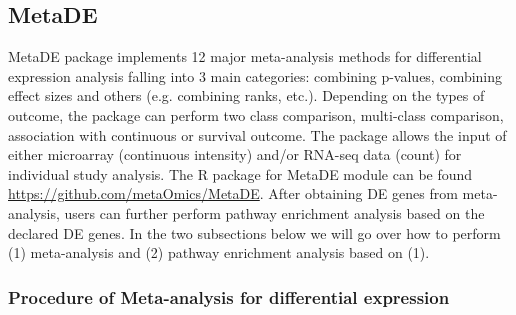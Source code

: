 \subsection{MetaDE}

MetaDE package implements 12 major meta-analysis methods for differential expression analysis falling into 3 main categories: combining p-values, combining effect sizes and others (e.g. combining ranks, etc.). Depending on the types of outcome, the package can perform two class comparison, multi-class comparison, association with continuous or survival outcome. The package allows the input of either microarray (continuous intensity) and/or RNA-seq data (count) for individual study analysis. 
The R package for MetaDE module can be found \url{https://github.com/metaOmics/MetaDE}.
After obtaining DE genes from meta-analysis, 
users can further perform pathway enrichment analysis based on the declared DE genes.
In the two subsections below we will go over how to perform (1) meta-analysis and (2) pathway enrichment analysis based on (1).


\subsubsection{Procedure of Meta-analysis for differential expression}

